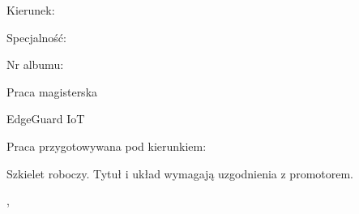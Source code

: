 \begin{titlepage}
\centering
{\Large\bfseries \ThesisUniversity\par}
\vspace{0.5cm}
{\large \ThesisFaculty\par}
\vspace{0.6cm}
Kierunek: \ThesisProgramme\par
Specjalność: \ThesisSpecialisation\par
\vfill
{\large \ThesisAuthor\par}
Nr albumu: \ThesisStudentNumber\par
\vspace{1cm}
{\LARGE\bfseries \ThesisTitle\par}
\vspace{0.8cm}
{\large Praca magisterska\par}
\vspace{0.4cm}
{\small EdgeGuard IoT\par}
\vfill
\begin{flushright}
Praca przygotowywana pod kierunkiem:\par
\ThesisSupervisor
\end{flushright}
\vspace{1cm}
{\small Szkielet roboczy. Tytuł i układ wymagają uzgodnienia z promotorem.\par}
\vspace{0.6cm}
\ThesisCity, \ThesisYear
\end{titlepage}
